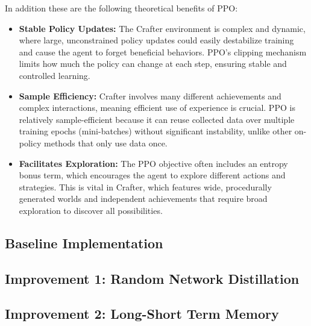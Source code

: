 \documentclass[twocolumn]{article}
\begin{document}
In addition these are the following theoretical benefits of PPO:
\begin{itemize}
    \item \textbf{Stable Policy Updates:} The Crafter environment is complex and dynamic, where large, unconstrained policy updates could easily destabilize training and cause the agent to forget beneficial behaviors. PPO's clipping mechanism limits how much the policy can change at each step, ensuring stable and controlled learning.
    \item \textbf{Sample Efficiency:} Crafter involves many different achievements and complex interactions, meaning efficient use of experience is crucial. PPO is relatively sample-efficient because it can reuse collected data over multiple training epochs (mini-batches) without significant instability, unlike other on-policy methods that only use data once.
    \item \textbf{Facilitates Exploration:} The PPO objective often includes an entropy bonus term, which encourages the agent to explore different actions and strategies. This is vital in Crafter, which features wide, procedurally generated worlds and independent achievements that require broad exploration to discover all possibilities.
\end{itemize}

\subsection*{Baseline Implementation}
\subsection*{Improvement 1: Random Network Distillation}
\subsection*{Improvement 2: Long-Short Term Memory}
\end{document}
